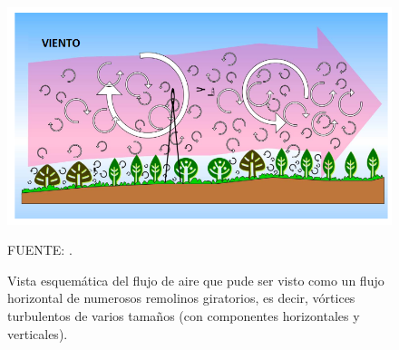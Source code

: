\begin{figure}[ht!]
\centering
	\includegraphics[scale=0.77]{Images/wang01.png}
	\caption{Vista esquemática del flujo de aire que pude ser visto como un flujo horizontal de numerosos remolinos giratorios, es decir, vórtices turbulentos de varios tamaños (con componentes horizontales y verticales).}
	{\raggedright FUENTE: \citet{wang2012review}.	 \par}

	\label{fig:wang01}
\end{figure}
